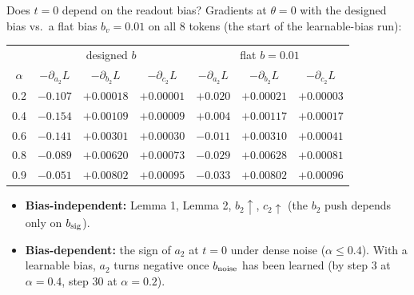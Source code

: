 \begin{frame}{Does $t=0$ depend on the readout bias?}
\small
Gradients at $\theta=0$ with the designed bias vs.\ a flat bias $b_v=0.01$ on all 8 tokens (the start of the learnable-bias run):
\begin{center}\footnotesize
\begin{tabular}{c|ccc|ccc}\toprule
& \multicolumn{3}{c|}{designed $b$} & \multicolumn{3}{c}{flat $b=0.01$}\\
$\alpha$ & $-\partial_{a_2}L$ & $-\partial_{b_2}L$ & $-\partial_{c_2}L$ & $-\partial_{a_2}L$ & $-\partial_{b_2}L$ & $-\partial_{c_2}L$\\\midrule
0.2 & $-0.107$ & $+0.00018$ & $+0.00001$ & $+0.020$ & $+0.00021$ & $+0.00003$\\
0.4 & $-0.154$ & $+0.00109$ & $+0.00009$ & $+0.004$ & $+0.00117$ & $+0.00017$\\
0.6 & $-0.141$ & $+0.00301$ & $+0.00030$ & $-0.011$ & $+0.00310$ & $+0.00041$\\
0.8 & $-0.089$ & $+0.00620$ & $+0.00073$ & $-0.029$ & $+0.00628$ & $+0.00081$\\
0.9 & $-0.051$ & $+0.00802$ & $+0.00095$ & $-0.033$ & $+0.00802$ & $+0.00096$\\\bottomrule
\end{tabular}
\end{center}
\begin{itemize}
\item \textbf{Bias-independent:} Lemma 1, Lemma 2, $b_2\uparrow$, $c_2\uparrow$ (the $b_2$ push depends only on $b_{\rm sig}$).
\item \textbf{Bias-dependent:} the sign of $a_2$ at $t=0$ under dense noise ($\alpha\le0.4$). With a learnable bias, $a_2$ turns
negative once $b_{\rm noise}$ has been learned (by step 3 at $\alpha=0.4$, step 30 at $\alpha=0.2$).
\end{itemize}
\end{frame}

